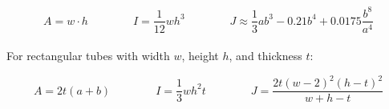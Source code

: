 \documentclass[a4paper]{article}
\begin{document}
	\begin{equation}
		A = w \cdot h \qquad\qquad
		I = \frac{1}{12} w h^3 \qquad\qquad
		J \approx \frac{1}{3} a b^3 - 0.21 b^4 + 0.0175 \frac{b^8}{a^4}
	\end{equation}
	\\
	For rectangular tubes with width $ w $, height $ h $, and thickness $ t $:
	
	\begin{equation}
		A = 2t(a+b) \qquad\qquad
		I = \frac{1}{3} w h^2 t \qquad\qquad
		J = \frac{2t (w-2)^2 (h-t)^2}{w + h - t}
	\end{equation}
	\\
	
	
	
\end{document}
